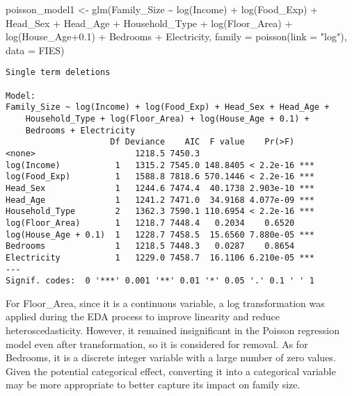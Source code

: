 \documentclass[
]{article}
\newenvironment{Shaded}{\begin{snugshade}}{\end{snugshade}}
\newcommand{\AttributeTok}[1]{\textcolor[rgb]{0.40,0.45,0.13}{#1}}
\newcommand{\FloatTok}[1]{\textcolor[rgb]{0.68,0.00,0.00}{#1}}
\newcommand{\FunctionTok}[1]{\textcolor[rgb]{0.28,0.35,0.67}{#1}}
\newcommand{\NormalTok}[1]{\textcolor[rgb]{0.00,0.23,0.31}{#1}}
\newcommand{\OtherTok}[1]{\textcolor[rgb]{0.00,0.23,0.31}{#1}}
\newcommand{\SpecialCharTok}[1]{\textcolor[rgb]{0.37,0.37,0.37}{#1}}
\newcommand{\StringTok}[1]{\textcolor[rgb]{0.13,0.47,0.30}{#1}}
\begin{document}
\begin{Shaded}
\begin{Highlighting}[]
\NormalTok{poisson\_model1 }\OtherTok{\textless{}{-}} \FunctionTok{glm}\NormalTok{(Family\_Size }\SpecialCharTok{\textasciitilde{}} 
                       \FunctionTok{log}\NormalTok{(Income) }\SpecialCharTok{+}
                       \FunctionTok{log}\NormalTok{(Food\_Exp) }\SpecialCharTok{+}
\NormalTok{                       Head\_Sex }\SpecialCharTok{+}
\NormalTok{                       Head\_Age }\SpecialCharTok{+} 
\NormalTok{                       Household\_Type }\SpecialCharTok{+}
                       \FunctionTok{log}\NormalTok{(Floor\_Area) }\SpecialCharTok{+}
                       \FunctionTok{log}\NormalTok{(House\_Age}\FloatTok{+0.1}\NormalTok{) }\SpecialCharTok{+}
\NormalTok{                       Bedrooms }\SpecialCharTok{+}
\NormalTok{                       Electricity, }
                     \AttributeTok{family =} \FunctionTok{poisson}\NormalTok{(}\AttributeTok{link =} \StringTok{"log"}\NormalTok{),}
                     \AttributeTok{data =}\NormalTok{ FIES)}
\end{Highlighting}
\end{Shaded}

\begin{verbatim}
Single term deletions

Model:
Family_Size ~ log(Income) + log(Food_Exp) + Head_Sex + Head_Age + 
    Household_Type + log(Floor_Area) + log(House_Age + 0.1) + 
    Bedrooms + Electricity
                     Df Deviance    AIC  F value    Pr(>F)    
<none>                    1218.5 7450.3                       
log(Income)           1   1315.2 7545.0 148.8405 < 2.2e-16 ***
log(Food_Exp)         1   1588.8 7818.6 570.1446 < 2.2e-16 ***
Head_Sex              1   1244.6 7474.4  40.1738 2.903e-10 ***
Head_Age              1   1241.2 7471.0  34.9168 4.077e-09 ***
Household_Type        2   1362.3 7590.1 110.6954 < 2.2e-16 ***
log(Floor_Area)       1   1218.7 7448.4   0.2034    0.6520    
log(House_Age + 0.1)  1   1228.7 7458.5  15.6560 7.880e-05 ***
Bedrooms              1   1218.5 7448.3   0.0287    0.8654    
Electricity           1   1229.0 7458.7  16.1106 6.210e-05 ***
---
Signif. codes:  0 '***' 0.001 '**' 0.01 '*' 0.05 '.' 0.1 ' ' 1
\end{verbatim}

For Floor\_Area, since it is a continuous variable, a log transformation
was applied during the EDA process to improve linearity and reduce
heteroscedasticity. However, it remained insignificant in the Poisson
regression model even after transformation, so it is considered for
removal. As for Bedrooms, it is a discrete integer variable with a large
number of zero values. Given the potential categorical effect,
converting it into a categorical variable may be more appropriate to
better capture its impact on family size.
\end{document}
